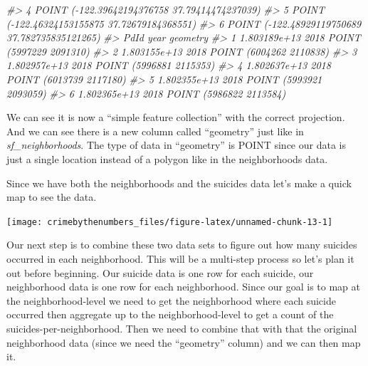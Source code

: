 \documentclass[
]{krantz}
\makeatletter
\newenvironment{Shaded}{\begin{snugshade}}{\end{snugshade}}
\newcommand{\AttributeTok}[1]{\textcolor[rgb]{0.61,0.61,0.61}{#1}}
\newcommand{\CommentTok}[1]{\textcolor[rgb]{0.37,0.37,0.37}{\textit{#1}}}
\newcommand{\ConstantTok}[1]{\textcolor[rgb]{0,0,0}{#1}}
\newcommand{\FunctionTok}[1]{\textcolor[rgb]{0,0,0}{#1}}
\newcommand{\NormalTok}[1]{#1}
\newcommand{\SpecialCharTok}[1]{\textcolor[rgb]{0,0,0}{#1}}
\newcommand{\StringTok}[1]{\textcolor[rgb]{0.5,0.5,0.5}{#1}}
\newenvironment{kframe}{%
\medskip{}
\setlength{\fboxsep}{.8em}
 \def\at@end@of@kframe{}%
 \ifinner\ifhmode%
  \def\at@end@of@kframe{\end{minipage}}%
  \begin{minipage}{\columnwidth}%
 \fi\fi%
 \def\FrameCommand##1{\hskip\@totalleftmargin \hskip-\fboxsep
 \colorbox{shadecolor}{##1}\hskip-\fboxsep
     \hskip-\linewidth \hskip-\@totalleftmargin \hskip\columnwidth}%
 \MakeFramed {\advance\hsize-\width
   \@totalleftmargin\z@ \linewidth\hsize
   \@setminipage}}%
 {\par\unskip\endMakeFramed%
 \at@end@of@kframe}
\renewenvironment{Shaded}{\begin{kframe}}{\end{kframe}}
\makeatother
\begin{document}
\begin{Shaded}
\begin{Highlighting}[]
\CommentTok{\#\textgreater{} 4  POINT ({-}122.39642194376758 37.79414474237039)}
\CommentTok{\#\textgreater{} 5  POINT ({-}122.46324153155875 37.72679184368551)}
\CommentTok{\#\textgreater{} 6 POINT ({-}122.48929119750689 37.782735835121265)}
\CommentTok{\#\textgreater{}           PdId year                geometry}
\CommentTok{\#\textgreater{} 1 1.803189e+13 2018 POINT (5997229 2091310)}
\CommentTok{\#\textgreater{} 2 1.803155e+13 2018 POINT (6004262 2110838)}
\CommentTok{\#\textgreater{} 3 1.802957e+13 2018 POINT (5996881 2115353)}
\CommentTok{\#\textgreater{} 4 1.802637e+13 2018 POINT (6013739 2117180)}
\CommentTok{\#\textgreater{} 5 1.802355e+13 2018 POINT (5993921 2093059)}
\CommentTok{\#\textgreater{} 6 1.802365e+13 2018 POINT (5986822 2113584)}
\end{Highlighting}
\end{Shaded}

We can see it is now a ``simple feature collection'' with the correct projection. And we can see there is a new column called ``geometry'' just like in \emph{sf\_neighborhoods}. The type of data in ``geometry'' is POINT since our data is just a single location instead of a polygon like in the neighborhoods data.

Since we have both the neighborhoods and the suicides data let's make a quick map to see the data.

\begin{Shaded}
\end{Shaded}

\begin{center}\texttt{[image: crimebythenumbers\_files/figure-latex/unnamed-chunk-13-1]} \end{center}

Our next step is to combine these two data sets to figure out how many suicides occurred in each neighborhood. This will be a multi-step process so let's plan it out before beginning. Our suicide data is one row for each suicide, our neighborhood data is one row for each neighborhood. Since our goal is to map at the neighborhood-level we need to get the neighborhood where each suicide occurred then aggregate up to the neighborhood-level to get a count of the suicides-per-neighborhood. Then we need to combine that with that the original neighborhood data (since we need the ``geometry'' column) and we can then map it.
\end{document}
